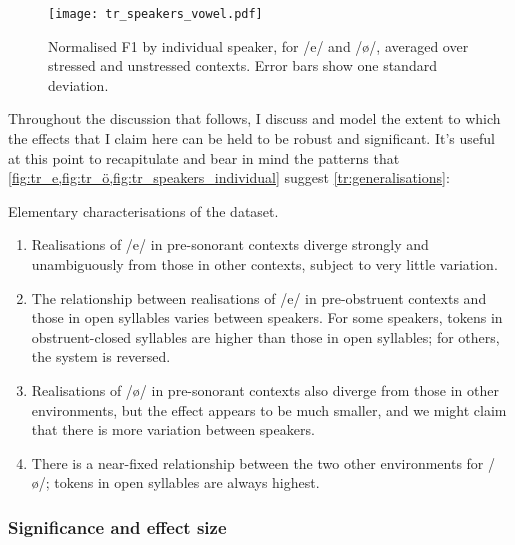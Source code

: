 \begin{figure}[H]
  \texttt{[image: tr\_speakers\_vowel.pdf]}
  \caption[Normalised F1 by individual speaker, for /e/ and /ø/.]{Normalised F1 by individual speaker, for /e/ and /ø/, averaged over stressed and unstressed contexts. Error bars show one standard deviation.}
  \label{fig:tr_speakers_individual}
\end{figure}

Throughout the discussion that follows, I discuss and model the extent to which the effects that I claim here can be held to be robust and significant. It's useful at this point to recapitulate and bear in mind the patterns that \cref{fig:tr_e,fig:tr_ö,fig:tr_speakers_individual} suggest \cref{tr:generalisations}:

\begin{example}\label{tr:generalisations}Elementary characterisations of the dataset.
\begin{enumerate}
  \item Realisations of /e/ in pre-sonorant contexts diverge strongly and unambiguously from those in other contexts, subject to very little variation.
  \item The relationship between realisations of /e/ in pre-obstruent contexts and those in open syllables varies between speakers. For some speakers, tokens in obstruent-closed syllables are higher than those in open syllables; for others, the system is reversed.
  \item Realisations of /ø/ in pre-sonorant contexts also diverge from those in other environments, but the effect appears to be much smaller, and we might claim that there is more variation between speakers.
  \item There is a near-fixed relationship between the two other environments for /ø/; tokens in open syllables are always highest.
\end{enumerate}
\end{example}

\subsubsection{Significance and effect size}

